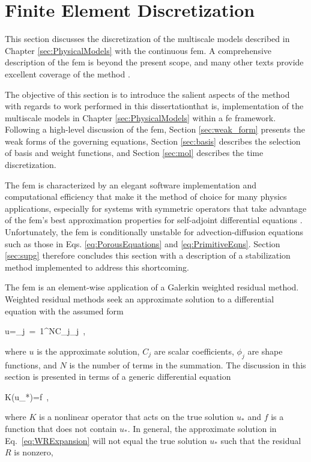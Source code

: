 \section{Finite Element Discretization}
\label{sec:fem}

This section discusses the discretization of the multiscale models described in Chapter \ref{sec:PhysicalModels} with the continuous \gls{fem}. A comprehensive description of the \gls{fem} is beyond the present scope, and many other texts provide excellent coverage of the method \cite{zienkiewicz,reddy,logan}. 

The objective of this section is to introduce the salient aspects of the method with regards to work performed in this dissertation\mdash that is, implementation of the multiscale models in Chapter \ref{sec:PhysicalModels} within a \gls{fe} framework. Following a high-level discussion of the \gls{fem}, Section \ref{sec:weak_form} presents the weak forms of the governing equations, Section \ref{sec:basis} describes the selection of basis and weight functions, and Section \ref{sec:mol} describes the time discretization. 

The \gls{fem} is characterized by an elegant software implementation and computational efficiency that make it the method of choice for many physics applications, especially for systems with symmetric operators that take advantage of the \gls{fem}'s best approximation properties for self-adjoint differential equations \cite{reddy,zohdi,zienkiewicz}. Unfortunately, the \gls{fem} is conditionally unstable for advection-diffusion equations such as those in Eqs. \eqref{eq:PorousEquations} and \eqref{eq:PrimitiveEqns}. Section \ref{sec:supg} therefore concludes this section with a description of a stabilization method implemented to address this shortcoming.

The \gls{fem} is an element-wise application of a Galerkin weighted residual method. Weighted residual methods seek an approximate solution to a differential equation with the assumed form

\beq
\label{eq:WRExpansion}
u=\sum_{j\ =\ 1}^NC_j\phi_j\ ,
\eeq

\noindent where \(u\) is the approximate solution, \(C_j\) are scalar coefficients, \(\phi_j\) are shape functions, and \(N\) is the number of terms in the summation. The discussion in this section is presented in terms of a generic differential equation

\beq
\label{eq:linear1}
K(u_*)=f\ ,
\eeq

\noindent where \(K\) is a nonlinear operator that acts on the true solution \(u_*\) and \(f\) is a function that does not contain \(u_*\). In general, the approximate solution in Eq.\ \eqref{eq:WRExpansion} will not equal the true solution \(u_*\) such that the residual \(R\) is nonzero,

